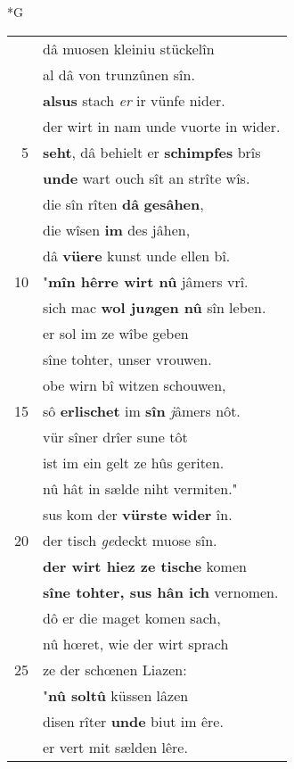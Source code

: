\documentclass[8pt,a4paper,notitlepage]{article}
\begin{document}
\begin{table}[ht]
\begin{minipage}[t]{0.5\linewidth}
\small
\begin{center}*G
\end{center}
\begin{tabular}{rl}
 & dâ muosen kleiniu stückelîn\\ 
 & al dâ von trunzûnen sîn.\\ 
 & \textbf{alsus} stach \textit{er} ir vünfe nider.\\ 
 & der wirt in nam unde vuorte in wider.\\ 
5 & \textbf{seht}, dâ behielt er \textbf{schimpfes} brîs\\ 
 & \textbf{unde} wart ouch sît an strîte wîs.\\ 
 & die sîn rîten \textbf{dâ} \textbf{gesâhen},\\ 
 & die wîsen \textbf{im} des jâhen,\\ 
 & dâ \textbf{vüere} kunst unde ellen bî.\\ 
10 & "\textbf{mîn hêrre wirt nû} jâmers vrî.\\ 
 & sich mac \textbf{wol ju\textit{n}gen nû} sîn leben.\\ 
 & er sol im ze wîbe geben\\ 
 & sîne tohter, unser vrouwen.\\ 
 & obe wirn bî witzen schouwen,\\ 
15 & sô \textbf{erlischet} im \textbf{sîn} \textit{j}âmers nôt.\\ 
 & vür sîner drîer sune tôt\\ 
 & ist im ein gelt ze hûs geriten.\\ 
 & nû hât in sælde niht vermiten."\\ 
 & sus kom der \textbf{vürste} \textbf{wider} în.\\ 
20 & der tisch \textit{ge}deckt muose sîn.\\ 
 & \textbf{der wirt hiez ze tische} komen\\ 
 & \textbf{sîne tohter, sus hân ich} vernomen.\\ 
 & dô er die maget komen sach,\\ 
 & nû hœret, wie der wirt sprach\\ 
25 & ze der schœnen Liazen:\\ 
 & "\textbf{nû soltû} küssen lâzen\\ 
 & disen rîter \textbf{unde} biut im êre.\\ 
 & er vert mit sælden lêre.\\ 

\end{tabular}
\end{minipage}
\end{table}
\end{document}
